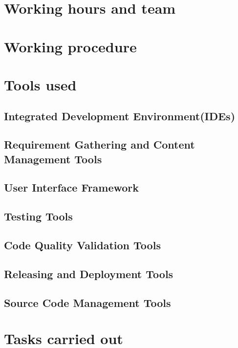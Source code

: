 \documentclass[12pt,a4paper]{report}
\begin{document}
\section{Working hours and team}

\section{Working procedure}

\section{Tools used}

\subsection{Integrated Development Environment(IDEs)}

\subsection{Requirement Gathering and Content Management Tools}

\subsection{User Interface Framework}

\subsection{Testing Tools}

\subsection{Code Quality Validation Tools}

\subsection{Releasing and Deployment Tools}

\subsection{Source Code Management Tools}


\section{Tasks carried out}
\end{document}
